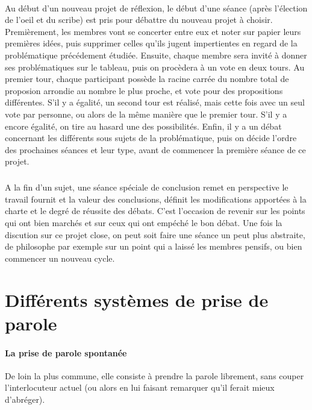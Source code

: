 \documentclass[a4paper,11pt]{article}
\begin{document}
\paragraph{}
Au début d'un nouveau projet de réflexion, le début d'une séance (après l'élection de l'oeil et du scribe) est pris pour débattre du nouveau projet à choisir. Premièrement, les membres vont se concerter entre eux et noter sur papier leurs premières idées, puis supprimer celles qu'ils jugent impertientes en regard de la problématique précédement étudiée. Ensuite, chaque membre sera invité à donner ses problématiques sur le tableau, puis on procèdera à un vote en deux tours.
Au premier tour, chaque participant possède la racine carrée du nombre total de proposion arrondie au nombre le plus proche, et vote pour des propositions différentes. S'il y a égalité, un second tour est réalisé, mais cette fois avec un seul vote par personne, ou alors de la même manière que le premier tour. S'il y a encore égalité, on tire au hasard une des possibilités. 
Enfin, il y a un débat concernant les différents sous sujets de la problématique, puis on décide l'ordre des prochaines séances et leur type, avant de commencer la première séance de ce projet.
\subparagraph{}
A la fin d'un sujet, une séance spéciale de conclusion remet en perspective le travail fournit et la valeur des conclusions, définit les modifications apportées à la charte et le degré de réussite des débats. C'est l'occasion de revenir sur les points qui ont bien marchés et sur ceux qui ont empéché le bon débat. Une fois la discution sur ce projet close, on peut soit faire une séance un peut plus abstraite, de philosophe par exemple sur un point qui a laissé les membres pensifs, ou bien commencer un nouveau cycle.

\section{Différents systèmes de prise de parole}
\paragraph{La prise de parole spontanée}
De loin la plus commune, elle consiste à prendre la parole librement, sans couper l'interlocuteur actuel (ou alors en lui faisant remarquer qu'il ferait mieux d'abréger).
\end{document}
